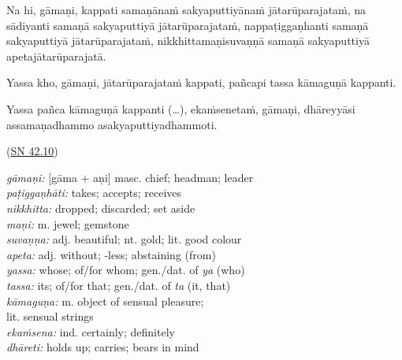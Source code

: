 \documentclass[11pt,oneside]{memoir}
\begin{document}
\begin{widecols}
Na hi, gāmaṇi, kappati samaṇānaṁ sakyaputtiyānaṁ jātarūparajataṁ, na sādiyanti samaṇā sakyaputtiyā jātarūparajataṁ, nappaṭiggaṇhanti samaṇā sakyaputtiyā jātarūparajataṁ, nikkhittamaṇisuvaṇṇā samaṇā sakyaputtiyā apetajātarūparajatā.

Yassa kho, gāmaṇi, jātarūparajataṁ kappati, pañcapi tassa kāmaguṇā kappanti.

Yassa pañca kāmaguṇā kappanti (…), ekaṁsenetaṁ, gāmaṇi, dhāreyyāsi assamaṇadhammo asakyaputtiyadhammoti.

(\href{https://suttacentral.net/sn42.10/pli/ms}{SN 42.10})

\columnbreak

\emph{gāmaṇi:} [gāma + aṇi] masc. chief; headman; leader \\[0pt]
\emph{paṭiggaṇhāti:} takes; accepts; receives \\[0pt]
\emph{nikkhitta:} dropped; discarded; set aside \\[0pt]
\emph{maṇi:} m. jewel; gemstone \\[0pt]
\emph{suvaṇṇa:} adj. beautiful; nt. gold; lit. good colour \\[0pt]
\emph{apeta:} adj. without; -less; abstaining (from) \\[0pt]
\emph{yassa:} whose; of/for whom; gen./dat. of \emph{ya} (who) \\[0pt]
\emph{tassa:} its; of/for that; gen./dat. of \emph{ta} (it, that) \\[0pt]
\emph{kāmaguṇa:} m. object of sensual pleasure; \\[0pt]
lit. sensual strings \\[0pt]
\emph{ekaṁsena:} ind. certainly; definitely \\[0pt]
\emph{dhāreti:} holds up; carries; bears in mind
\end{widecols}

\bigskip
\end{document}
